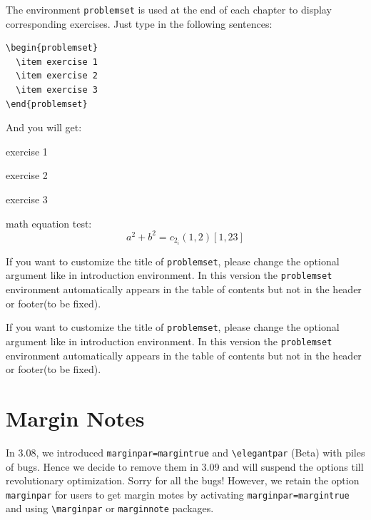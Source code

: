 \documentclass[11pt]{elegantbook}
\begin{document}
The environment \lstinline{problemset} is used at the end of each chapter to display corresponding exercises. Just type in the following sentences:
\begin{lstlisting}
\begin{problemset}
  \item exercise 1
  \item exercise 2
  \item exercise 3
\end{problemset}
\end{lstlisting}
And you will get:
\begin{problemset}
  \item exercise 1
  \item exercise 2
  \item exercise 3
  \item math equation test:
  \begin{equation}
  a^2+b^2=c_{2_{i}} (1,2) [1,23]
  \end{equation}
\end{problemset}
\begin{remark}
If you want to customize the title of \lstinline{problemset}, please change the optional argument like in introduction environment. In this version the \lstinline{problemset} environment automatically appears in the table of contents but not in the header or footer(to be fixed).
\end{remark}

\begin{solution}
  If you want to customize the title of \lstinline{problemset}, please change the optional argument like in introduction environment. In this version the \lstinline{problemset} environment automatically appears in the table of contents but not in the header or footer(to be fixed).
\end{solution}

\section{Margin Notes}
In 3.08, we introduced \lstinline{marginpar=margintrue} and \lstinline{\elegantpar} (Beta) with piles of bugs. Hence we decide to remove them in 3.09 and will suspend the options till revolutionary optimization. Sorry for all the bugs! However, we retain the option \lstinline{marginpar} for users to get margin motes by activating \lstinline{marginpar=margintrue} and using \lstinline{\marginpar} or \lstinline{marginnote} packages.
\end{document}
